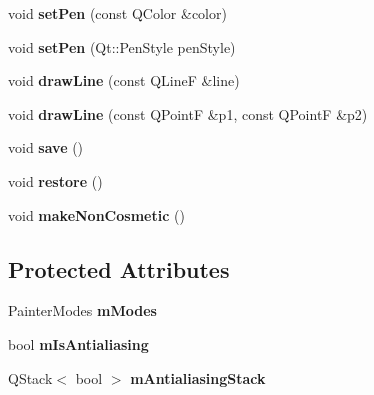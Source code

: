 \begin{DoxyCompactItemize}
\item 
void {\bfseries set\+Pen} (const Q\+Color \&color)\hypertarget{class_q_c_p_painter_a5c4d88f21564e156e88ef807f7cf0003}{}\label{class_q_c_p_painter_a5c4d88f21564e156e88ef807f7cf0003}

\item 
void {\bfseries set\+Pen} (Qt\+::\+Pen\+Style pen\+Style)\hypertarget{class_q_c_p_painter_a25e76095aae41da0d08035060e5f81ca}{}\label{class_q_c_p_painter_a25e76095aae41da0d08035060e5f81ca}

\item 
void {\bfseries draw\+Line} (const Q\+LineF \&line)\hypertarget{class_q_c_p_painter_a0b4b1b9bd495e182c731774dc800e6e0}{}\label{class_q_c_p_painter_a0b4b1b9bd495e182c731774dc800e6e0}

\item 
void {\bfseries draw\+Line} (const Q\+PointF \&p1, const Q\+PointF \&p2)\hypertarget{class_q_c_p_painter_ad1638db27929491b3f1beb74d6cbad5e}{}\label{class_q_c_p_painter_ad1638db27929491b3f1beb74d6cbad5e}

\item 
void {\bfseries save} ()\hypertarget{class_q_c_p_painter_a8fd6821ee6fecbfa04444c9062912abd}{}\label{class_q_c_p_painter_a8fd6821ee6fecbfa04444c9062912abd}

\item 
void {\bfseries restore} ()\hypertarget{class_q_c_p_painter_a64908e6298d5bbd83457dc987cc3a022}{}\label{class_q_c_p_painter_a64908e6298d5bbd83457dc987cc3a022}

\item 
void {\bfseries make\+Non\+Cosmetic} ()\hypertarget{class_q_c_p_painter_a7e63fbcf47e35c6f2ecd11b8fef7c7d8}{}\label{class_q_c_p_painter_a7e63fbcf47e35c6f2ecd11b8fef7c7d8}

\end{DoxyCompactItemize}
\subsection*{Protected Attributes}
\begin{DoxyCompactItemize}
\item 
Painter\+Modes {\bfseries m\+Modes}\hypertarget{class_q_c_p_painter_af5d1d6e5df0adbc7de5633250fb3396c}{}\label{class_q_c_p_painter_af5d1d6e5df0adbc7de5633250fb3396c}

\item 
bool {\bfseries m\+Is\+Antialiasing}\hypertarget{class_q_c_p_painter_a7055085da176aee0f6b23298f1003d08}{}\label{class_q_c_p_painter_a7055085da176aee0f6b23298f1003d08}

\item 
Q\+Stack$<$ bool $>$ {\bfseries m\+Antialiasing\+Stack}\hypertarget{class_q_c_p_painter_a1e7db2d502086480a77540196cb8b085}{}\label{class_q_c_p_painter_a1e7db2d502086480a77540196cb8b085}

\end{DoxyCompactItemize}



